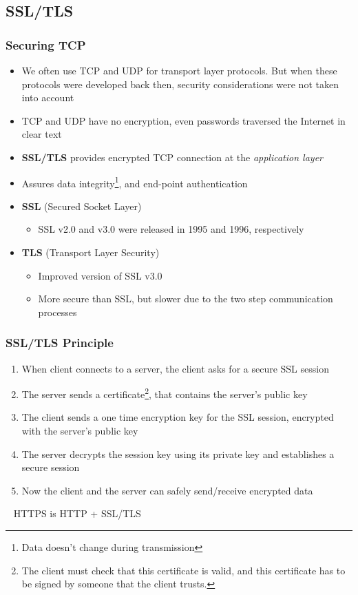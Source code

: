 \subsection{SSL/TLS}
\subsubsection{Securing TCP}
\begin{itemize}
	\item We often use TCP and UDP for transport layer protocols. But when these protocols were developed back then, security considerations were not taken into account
	\item TCP and UDP have no encryption, even passwords traversed the Internet in clear text
	\item \textbf{SSL/TLS} provides encrypted TCP connection at the \textit{application layer}
	\item Assures data integrity\footnote{Data doesn't change during transmission}, and end-point authentication
	\item \textbf{SSL} (Secured Socket Layer)
	\begin{itemize}
		\item SSL v2.0 and v3.0 were released in 1995 and 1996, respectively
	\end{itemize}
	\item \textbf{TLS} (Transport Layer Security)
	\begin{itemize}
		\item Improved version of SSL v3.0
		\item More secure than SSL, but slower due to the two step communication processes
	\end{itemize}
\end{itemize}

\subsubsection{SSL/TLS Principle}
\begin{enumerate}
	\item When client connects to a server, the client asks for a secure SSL session
	\item The server sends a certificate\footnote{The client must check that this certificate is valid, and this certificate has to be signed by someone that the client trusts.}, that contains the server's public key
	\item The client sends a one time encryption key for the SSL session, encrypted with the server's public key
	\item The server decrypts the session key using its private key and establishes a secure session
	\item Now the client and the server can safely send/receive encrypted data
\end{enumerate}~
HTTPS is HTTP + SSL/TLS

